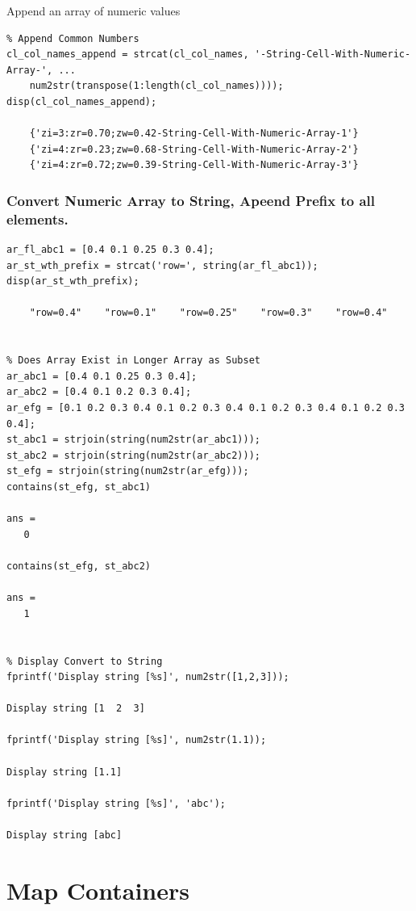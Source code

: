 \documentclass[
]{book}
\begin{document}
Append an array of numeric values

\begin{verbatim}
% Append Common Numbers
cl_col_names_append = strcat(cl_col_names, '-String-Cell-With-Numeric-Array-', ...
    num2str(transpose(1:length(cl_col_names))));
disp(cl_col_names_append);

    {'zi=3:zr=0.70;zw=0.42-String-Cell-With-Numeric-Array-1'}
    {'zi=4:zr=0.23;zw=0.68-String-Cell-With-Numeric-Array-2'}
    {'zi=4:zr=0.72;zw=0.39-String-Cell-With-Numeric-Array-3'}
\end{verbatim}

\hypertarget{convert-numeric-array-to-string-apeend-prefix-to-all-elements.}{%
\subsubsection{Convert Numeric Array to String, Apeend Prefix to all elements.}\label{convert-numeric-array-to-string-apeend-prefix-to-all-elements.}}

\begin{verbatim}
ar_fl_abc1 = [0.4 0.1 0.25 0.3 0.4];
ar_st_wth_prefix = strcat('row=', string(ar_fl_abc1));
disp(ar_st_wth_prefix);

    "row=0.4"    "row=0.1"    "row=0.25"    "row=0.3"    "row=0.4"


% Does Array Exist in Longer Array as Subset
ar_abc1 = [0.4 0.1 0.25 0.3 0.4];
ar_abc2 = [0.4 0.1 0.2 0.3 0.4];
ar_efg = [0.1 0.2 0.3 0.4 0.1 0.2 0.3 0.4 0.1 0.2 0.3 0.4 0.1 0.2 0.3 0.4];
st_abc1 = strjoin(string(num2str(ar_abc1)));
st_abc2 = strjoin(string(num2str(ar_abc2)));
st_efg = strjoin(string(num2str(ar_efg)));
contains(st_efg, st_abc1)

ans = 
   0

contains(st_efg, st_abc2)

ans = 
   1


% Display Convert to String
fprintf('Display string [%s]', num2str([1,2,3]));

Display string [1  2  3]

fprintf('Display string [%s]', num2str(1.1));

Display string [1.1]

fprintf('Display string [%s]', 'abc');

Display string [abc]
\end{verbatim}

\hypertarget{map-containers}{%
\section{Map Containers}\label{map-containers}}
\end{document}
